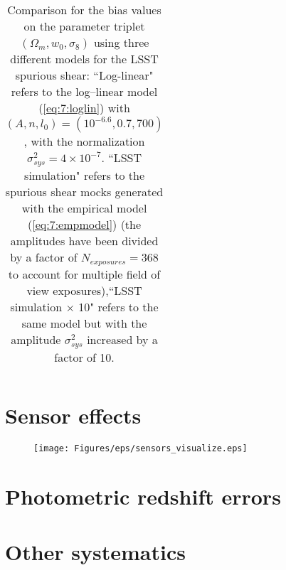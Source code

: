 \begin{table}
\begin{center}
\begin{tabular}{c|ccc}
\end{tabular}
\end{center}

\caption{Comparison for the bias values on the parameter triplet $(\Omega_m,w_0,\sigma_8)$ using three different models for the LSST spurious shear: ``Log-linear" refers to the log--linear model (\ref{eq:7:loglin}) with $(A,n,l_0)=(10^{-6.6},0.7,700)$, with the normalization $\sigma^2_{sys}=4\times10^{-7}$. ``LSST simulation" refers to the spurious shear mocks generated with the empirical model (\ref{eq:7:empmodel}) (the amplitudes have been divided by a factor of $N_{exposures}=368$ to account for multiple field of view exposures),``LSST simulation $\times$ 10" refers to the same model but with the amplitude $\sigma^2_{sys}$ increased by a factor of 10.}
\label{tab:7:spbias}
\end{table} 

\section{Sensor effects}
%
\begin{figure}
\begin{center}
\texttt{[image: Figures/eps/sensors\_visualize.eps]}
\end{center}
\caption{}
\label{fig:7:sensvis}
\end{figure}

\section{Photometric redshift errors}

\section{Other systematics}

